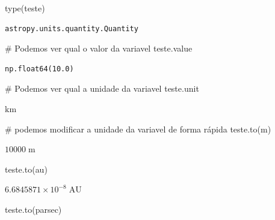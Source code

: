 \documentclass[
  letterpaper,
  DIV=11,
  numbers=noendperiod]{scrreprt}
\newenvironment{Shaded}{\begin{snugshade}}{\end{snugshade}}
\newcommand{\BuiltInTok}[1]{\textcolor[rgb]{0.00,0.23,0.31}{#1}}
\newcommand{\CommentTok}[1]{\textcolor[rgb]{0.37,0.37,0.37}{#1}}
\newcommand{\NormalTok}[1]{\textcolor[rgb]{0.00,0.23,0.31}{#1}}
\newcommand{\StringTok}[1]{\textcolor[rgb]{0.13,0.47,0.30}{#1}}
\begin{document}
\begin{Shaded}
\begin{Highlighting}[]
\BuiltInTok{type}\NormalTok{(teste)}
\end{Highlighting}
\end{Shaded}

\begin{verbatim}
astropy.units.quantity.Quantity
\end{verbatim}

\begin{Shaded}
\begin{Highlighting}[]
\CommentTok{\# Podemos ver qual o valor da variavel}
\NormalTok{teste.value}
\end{Highlighting}
\end{Shaded}

\begin{verbatim}
np.float64(10.0)
\end{verbatim}

\begin{Shaded}
\begin{Highlighting}[]
\CommentTok{\# Podemos ver qual a unidade da variavel}
\NormalTok{teste.unit}
\end{Highlighting}
\end{Shaded}

$\mathrm{km}$

\begin{Shaded}
\begin{Highlighting}[]
\CommentTok{\# podemos modificar a unidade da variavel de forma rápida}
\NormalTok{teste.to(}\StringTok{\textquotesingle{}m\textquotesingle{}}\NormalTok{)}
\end{Highlighting}
\end{Shaded}

$10000 \; \mathrm{m}$

\begin{Shaded}
\begin{Highlighting}[]
\NormalTok{teste.to(}\StringTok{\textquotesingle{}au\textquotesingle{}}\NormalTok{)}
\end{Highlighting}
\end{Shaded}

$6.6845871 \times 10^{-8} \; \mathrm{AU}$

\begin{Shaded}
\begin{Highlighting}[]
\NormalTok{teste.to(}\StringTok{\textquotesingle{}parsec\textquotesingle{}}\NormalTok{)}
\end{Highlighting}
\end{Shaded}
\end{document}
